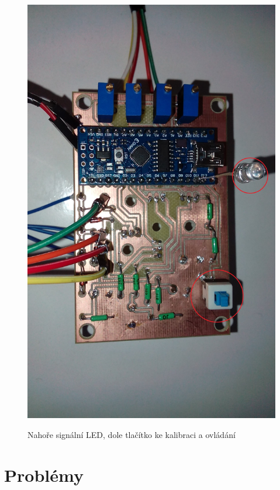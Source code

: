 \documentclass[12pt,oneside]{book} %
\begin{document}
\begin{figure}[h]\small\centering
\includegraphics[width=1.00\textwidth]{./img/Navod.jpg}\\[1cm] 
\caption{Nahoře signální LED, dole tlačítko ke kalibraci a ovládání}
\label{Navod}
\end{figure}  

\chapter{Problémy}\label{progProb}
\end{document}
